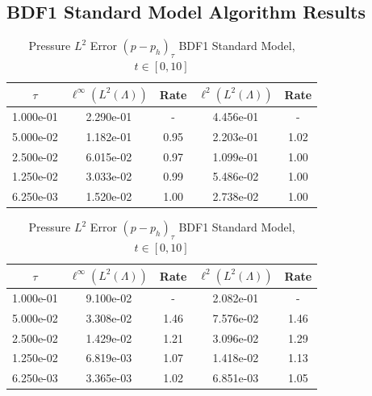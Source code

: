 \documentclass[letterpaper]{erdc}
\begin{document}
\subsection{BDF1 Standard Model Algorithm Results}
\begin{table}[h!]
  \parbox{.45\linewidth}{
  \tiny
  \centering
    \caption{Density $L^2$ Error $(\rho - \rho_h)_{\tau}$ BDF1 Standard Model, $t\in[0,10]$}
    \begin{tabular}{c|c|c|c|c}\label{table:firstconvergenceresult}
      $\tau$  & $\ell^{\infty}\left(L^2(\Lambda)\right)$ &  Rate  &  $\ell^2\left(L^2(\Lambda)\right)$  &  Rate\\
      \hline
      1.000e-01 & 2.290e-01 &  -   & 4.456e-01 &  -  \\
      5.000e-02 & 1.182e-01 & 0.95 & 2.203e-01 & 1.02\\
      2.500e-02 & 6.015e-02 & 0.97 & 1.099e-01 & 1.00\\
      1.250e-02 & 3.033e-02 & 0.99 & 5.486e-02 & 1.00\\
      6.250e-03 & 1.520e-02 & 1.00 & 2.738e-02 & 1.00
    \end{tabular}
    }
    \hfill
    \parbox{.45\linewidth}{
      \tiny
      \centering
        \caption{Pressure $L^2$ Error $(p - p_h)_{\tau}$ BDF1 Standard Model, $t\in[0,10]$}
        \begin{tabular}{c|c|c|c|c}
          $\tau$ &  $\ell^{\infty}\left(L^2(\Lambda)\right)$ &  Rate  &  $\ell^2\left(L^2(\Lambda)\right)$  &  Rate\\
          \hline
          1.000e-01 & 9.100e-02 &  -   & 2.082e-01 &  -  \\
          5.000e-02 & 3.308e-02 & 1.46 & 7.576e-02 & 1.46\\
          2.500e-02 & 1.429e-02 & 1.21 & 3.096e-02 & 1.29\\
          1.250e-02 & 6.819e-03 & 1.07 & 1.418e-02 & 1.13\\
          6.250e-03 & 3.365e-03 & 1.02 & 6.851e-03 & 1.05
        \end{tabular}
    }
\end{table}
\end{document}
